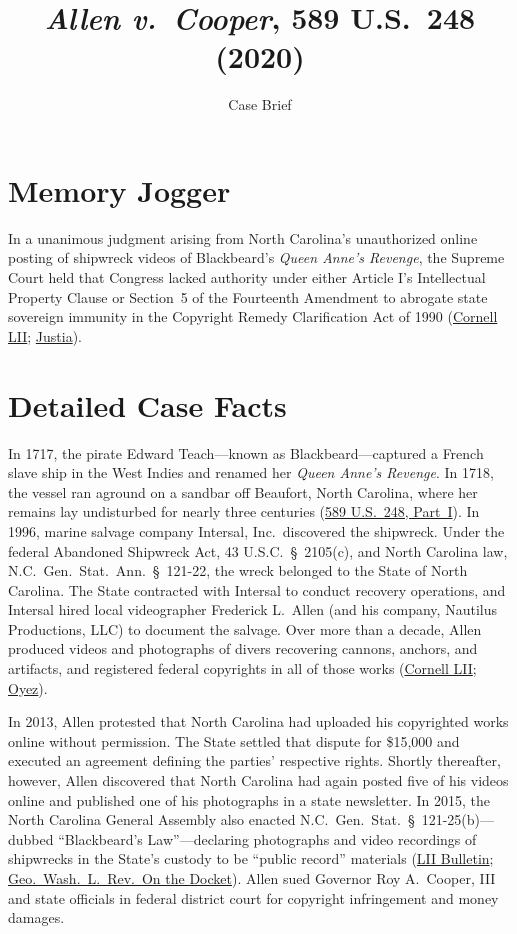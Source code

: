 \documentclass[12pt]{article}
\title{\textit{Allen v.\ Cooper}, 589 U.S.\ 248 (2020)}
\subtitle{Case Brief}
\author{}
\date{}
\begin{document}
\maketitle

\section{Memory Jogger}
In a unanimous judgment arising from North Carolina's unauthorized online posting of shipwreck videos of Blackbeard's \textit{Queen Anne's Revenge}, the Supreme Court held that Congress lacked authority under either Article I's Intellectual Property Clause or Section~5 of the Fourteenth Amendment to abrogate state sovereign immunity in the Copyright Remedy Clarification Act of 1990 (\href{https://www.law.cornell.edu/supremecourt/text/18-877}{Cornell LII}; \href{https://supreme.justia.com/cases/federal/us/589/18-877/}{Justia}).

\section{Detailed Case Facts}
In 1717, the pirate Edward Teach---known as Blackbeard---captured a French slave ship in the West Indies and renamed her \textit{Queen Anne's Revenge}. In 1718, the vessel ran aground on a sandbar off Beaufort, North Carolina, where her remains lay undisturbed for nearly three centuries (\href{https://www.law.cornell.edu/supremecourt/text/18-877}{589 U.S.\ 248, Part~I}). In 1996, marine salvage company Intersal, Inc.\ discovered the shipwreck. Under the federal Abandoned Shipwreck Act, 43 U.S.C.\ \S~2105(c), and North Carolina law, N.C.\ Gen.\ Stat.\ Ann.\ \S~121-22, the wreck belonged to the State of North Carolina. The State contracted with Intersal to conduct recovery operations, and Intersal hired local videographer Frederick L.\ Allen (and his company, Nautilus Productions, LLC) to document the salvage. Over more than a decade, Allen produced videos and photographs of divers recovering cannons, anchors, and artifacts, and registered federal copyrights in all of those works (\href{https://www.law.cornell.edu/supremecourt/text/18-877}{Cornell LII}; \href{https://www.oyez.org/cases/2019/18-877}{Oyez}).

In 2013, Allen protested that North Carolina had uploaded his copyrighted works online without permission. The State settled that dispute for \$15,000 and executed an agreement defining the parties' respective rights. Shortly thereafter, however, Allen discovered that North Carolina had again posted five of his videos online and published one of his photographs in a state newsletter. In 2015, the North Carolina General Assembly also enacted N.C.\ Gen.\ Stat.\ \S~121-25(b)---dubbed ``Blackbeard's Law''---declaring photographs and video recordings of shipwrecks in the State's custody to be ``public record'' materials (\href{https://www.law.cornell.edu/supct/cert/18-877}{LII Bulletin}; \href{https://www.gwlr.org/allen-v-cooper-states-stay-copyright-pirates/}{Geo.\ Wash.\ L.\ Rev.\ On the Docket}). Allen sued Governor Roy A.\ Cooper, III and state officials in federal district court for copyright infringement and money damages.
\end{document}
